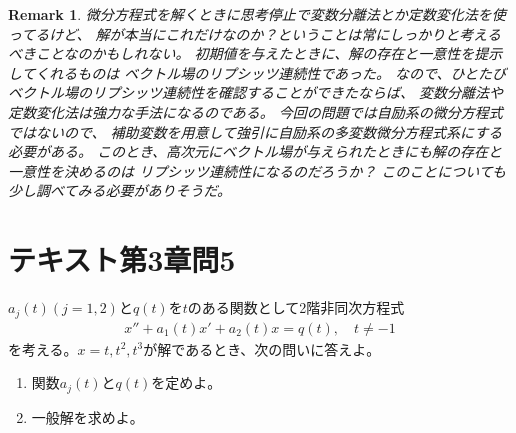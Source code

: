 \documentclass[fleqn]{jsarticle}
\newtheorem{remark}{Remark}
\begin{document}
\begin{remark}
微分方程式を解くときに思考停止で変数分離法とか定数変化法を使ってるけど、
解が本当にこれだけなのか？ということは常にしっかりと考えるべきことなのかもしれない。
初期値を与えたときに、解の存在と一意性を提示してくれるものは
ベクトル場のリプシッツ連続性であった。
なので、ひとたびベクトル場のリプシッツ連続性を確認することができたならば、
変数分離法や定数変化法は強力な手法になるのである。
今回の問題では自励系の微分方程式ではないので、
補助変数を用意して強引に自励系の多変数微分方程式系にする必要がある。
このとき、高次元にベクトル場が与えられたときにも解の存在と一意性を決めるのは
リプシッツ連続性になるのだろうか？
このことについても少し調べてみる必要がありそうだ。
\end{remark}

\section{テキスト第3章問5}
\begin{shaded}
$a_{j}(t)(j=1,2)$と$q(t)$を$t$のある関数として2階非同次方程式
\begin{eqnarray}
x''+a_{1}(t)x'+a_{2}(t)x=q(t),\quad t\ne -1
\end{eqnarray}
を考える。$x=t,t^{2},t^{3}$が解であるとき、次の問いに答えよ。
\begin{enumerate}
\item 関数$a_{j}(t)$と$q(t)$を定めよ。
\item 一般解を求めよ。
\end{enumerate}
\end{shaded}
\end{document}
